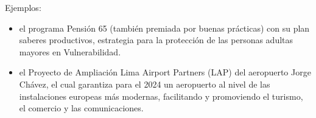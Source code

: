 \documentclass[
  letterpaper,
  DIV=11,
  numbers=noendperiod]{scrartcl}
\providecommand{\tightlist}{%
  \setlength{\itemsep}{0pt}\setlength{\parskip}{0pt}}\usepackage{longtable,booktabs,array}
\begin{document}
Ejemplos:

\begin{itemize}
\tightlist
\item
  el programa Pensión 65 (también premiada por buenas prácticas) con su
  plan saberes productivos, estrategia para la protección de las
  personas adultas mayores en Vulnerabilidad.
\item
  el Proyecto de Ampliación Lima Airport Partners (LAP) del aeropuerto
  Jorge Chávez, el cual garantiza para el 2024 un aeropuerto al nivel de
  las instalaciones europeas más modernas, facilitando y promoviendo el
  turismo, el comercio y las comunicaciones.
\end{itemize}


\printbibliography
\end{document}
